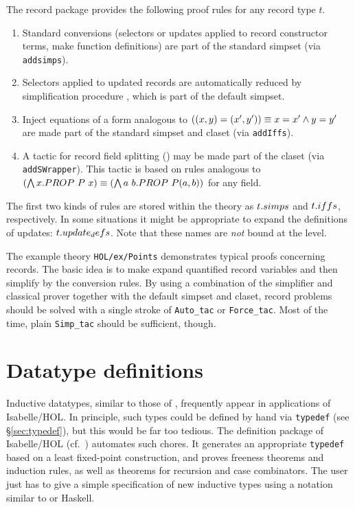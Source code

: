 The record package provides the following proof rules for any record type $t$.
\begin{enumerate}
  
\item Standard conversions (selectors or updates applied to record constructor
  terms, make function definitions) are part of the standard simpset (via
  \texttt{addsimps}).
  
\item Selectors applied to updated records are automatically reduced by
  simplification procedure , which is part of the
  default simpset.
  
\item Inject equations of a form analogous to $((x, y) = (x', y')) \equiv x=x'
  \wedge y=y'$ are made part of the standard simpset and claset (via
  \texttt{addIffs}).
  
\item A tactic for record field splitting () may be
  made part of the claset (via \texttt{addSWrapper}).  This tactic is based on
  rules analogous to $(\bigwedge x. PROP~P~x) \equiv (\bigwedge a~b. PROP~P(a, b))$ for
  any field.
\end{enumerate}

The first two kinds of rules are stored within the theory as $t\mathord. simps$ and
$t\mathord. iffs$, respectively.  In some situations it might be appropriate to
expand the definitions of updates: $t\mathord. update_defs$.  Note that these names
are \emph{not} bound at the {\ML} level.

\medskip

The example theory \texttt{HOL/ex/Points} demonstrates typical proofs
concerning records.  The basic idea is to make 
expand quantified record variables and then simplify by the conversion rules.
By using a combination of the simplifier and classical prover together with
the default simpset and claset, record problems should be solved with a single
stroke of \texttt{Auto_tac} or \texttt{Force_tac}.  Most of the time, plain
\texttt{Simp_tac} should be sufficient, though.


\section{Datatype definitions}
\label{sec:HOL:datatype}

Inductive datatypes, similar to those of \ML, frequently appear in
applications of Isabelle/HOL.  In principle, such types could be defined by
hand via \texttt{typedef} (see {\S}\ref{sec:typedef}), but this would be far too
tedious.  The  definition package of Isabelle/HOL (cf.\ 
\cite{Berghofer-Wenzel:1999:TPHOL}) automates such chores.  It generates an
appropriate \texttt{typedef} based on a least fixed-point construction, and
proves freeness theorems and induction rules, as well as theorems for
recursion and case combinators.  The user just has to give a simple
specification of new inductive types using a notation similar to {\ML} or
Haskell.

